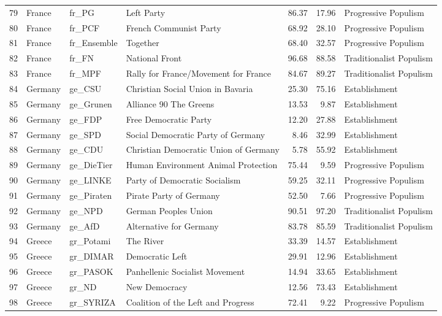 \begin{landscape}
\begin{longtable}[c]{@{\extracolsep{\fill}}rlllrrl}
  79 & France & fr\_PG & Left Party & 86.37 & 17.96 & Progressive Populism \\ 
  80 & France & fr\_PCF & French Communist Party & 68.92 & 28.10 & Progressive Populism \\ 
  81 & France & fr\_Ensemble & Together & 68.40 & 32.57 & Progressive Populism \\ 
  82 & France & fr\_FN & National Front & 96.68 & 88.58 & Traditionalist Populism \\ 
  83 & France & fr\_MPF & Rally for France/Movement for France & 84.67 & 89.27 & Traditionalist Populism \\ 
  84 & Germany & ge\_CSU & Christian Social Union in Bavaria & 25.30 & 75.16 & Establishment \\ 
  85 & Germany & ge\_Grunen & Alliance 90 The Greens & 13.53 & 9.87 & Establishment \\ 
  86 & Germany & ge\_FDP & Free Democratic Party & 12.20 & 27.88 & Establishment \\ 
  87 & Germany & ge\_SPD & Social Democratic Party of Germany & 8.46 & 32.99 & Establishment \\ 
  88 & Germany & ge\_CDU & Christian Democratic Union of Germany & 5.78 & 55.92 & Establishment \\ 
  89 & Germany & ge\_DieTier & Human Environment Animal Protection & 75.44 & 9.59 & Progressive Populism \\ 
  90 & Germany & ge\_LINKE & Party of Democratic Socialism & 59.25 & 32.11 & Progressive Populism \\ 
  91 & Germany & ge\_Piraten & Pirate Party of Germany & 52.50 & 7.66 & Progressive Populism \\ 
  92 & Germany & ge\_NPD & German Peoples Union & 90.51 & 97.20 & Traditionalist Populism \\ 
  93 & Germany & ge\_AfD & Alternative for Germany & 83.78 & 85.59 & Traditionalist Populism \\ 
  94 & Greece & gr\_Potami & The River & 33.39 & 14.57 & Establishment \\ 
  95 & Greece & gr\_DIMAR & Democratic Left & 29.91 & 12.96 & Establishment \\ 
  96 & Greece & gr\_PASOK & Panhellenic Socialist Movement & 14.94 & 33.65 & Establishment \\ 
  97 & Greece & gr\_ND & New Democracy & 12.56 & 73.43 & Establishment \\ 
  98 & Greece & gr\_SYRIZA & Coalition of the Left and Progress & 72.41 & 9.22 & Progressive Populism \\ 

\end{longtable}
\end{landscape}
